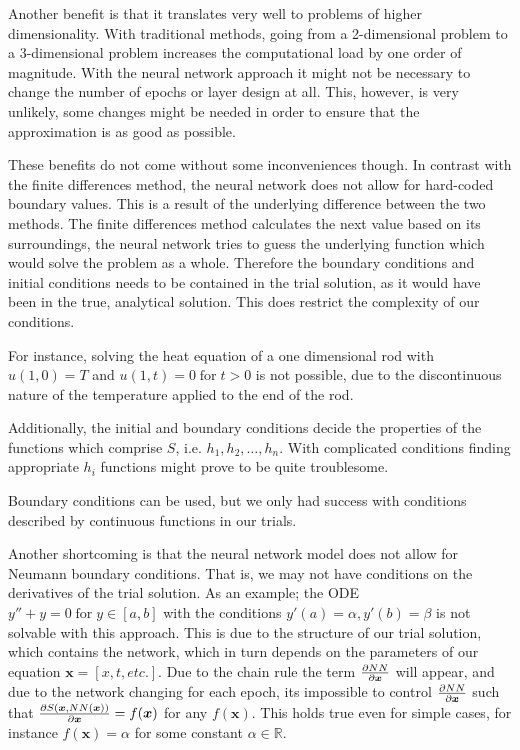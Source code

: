 \documentclass[aps,reprint,superscriptaddress,nofootinbib]{revtex4-2}
\begin{document}
Another benefit is that it translates very well to problems of higher dimensionality. With traditional methods, going from a 2-dimensional problem to a 3-dimensional problem increases the computational load by one order of magnitude. With the neural network approach it might not be necessary to change the number of epochs or layer design at all. This, however, is very unlikely, some changes might be needed in order to ensure that the approximation is as good as possible.

These benefits do not come without some inconveniences though. 
In contrast with the finite differences method, the neural network does not allow for hard-coded boundary values. This is a result of the underlying difference between the two methods. The finite differences method calculates the next value based on its surroundings, the neural network tries to guess the underlying function which would solve the problem as a whole. Therefore the boundary conditions and initial conditions needs to be contained in the trial solution, as it would have been in the true, analytical solution. This does restrict the complexity of our conditions.

For instance, solving the heat equation of a one dimensional rod with $u(1, 0) = T$ and $u(1, t) = 0 \; \text{for} \; t > 0$ is not possible, due to the discontinuous nature of the temperature applied to the end of the rod.

Additionally, the initial and boundary conditions decide the properties of the functions which comprise $S$, i.e. $h_1, h_2, \dots, h_n$. With complicated conditions finding appropriate $h_i$ functions might prove to be quite troublesome.

Boundary conditions can be used, but we only had success with conditions described by continuous functions in our trials.

Another shortcoming is that the neural network model does not allow for Neumann boundary conditions. That is, we may not have conditions on the derivatives of the trial solution.
As an example; the ODE $y'' + y = 0 \; \text{for} \; y \in [a, b]$ with the conditions $y'(a) = \alpha, y'(b) = \beta$ is not solvable with this approach. This is due to the structure of our trial solution, which contains the network, which in turn depends on the parameters of our equation $\bm x = [x, t, etc.]$. Due to the chain rule the term $\pdv{NN}{\bm x}$ will appear, and due to the network changing for each epoch, its impossible to control $\pdv{NN}{\bm x}$ such that $\pdv{S(\bm x, NN(\bm x))}{\bm x} = f(\bm x)$ for any $f(\bm x)$. This holds true even for simple cases, for instance $f(\bm x) = \alpha$ for some constant $\alpha \in \mathbb{R}$.
\end{document}
